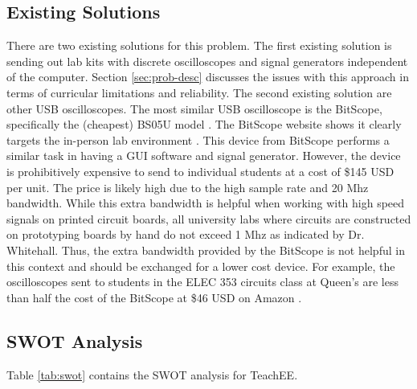 \documentclass[letterpaper,12pt]{article}
\begin{document}
\subsection{Existing Solutions} \label{sec:existing-sol} There are two existing
solutions for this problem. The first existing solution is sending out lab kits
with discrete oscilloscopes and signal generators independent of the computer.
Section \ref{sec:prob-desc} discusses the issues with this approach in terms of
curricular limitations and reliability. The second existing solution are other
USB oscilloscopes. The most similar USB oscilloscope is the BitScope,
specifically the (cheapest) BS05U model \cite{noauthor_bitscope_nodate}. The
BitScope website shows it clearly targets the in-person lab environment
\cite{bitscope_education}. This device from BitScope performs a similar task in
having a GUI software and signal generator. However, the device is prohibitively
expensive to send to individual students at a cost of \$145 USD per unit. The
price is likely high due to the high sample rate and 20 Mhz bandwidth. While
this extra bandwidth is helpful when working with high speed signals on printed
circuit boards, all university labs where circuits are constructed on prototyping
boards by hand do not exceed 1 Mhz as indicated by Dr. Whitehall. Thus, the
extra bandwidth provided by the BitScope is not helpful in this context and
should be exchanged for a lower cost device. For example, the oscilloscopes sent to
students in the ELEC 353 circuits class at Queen's are less than half the cost
of the BitScope at \$46 USD on Amazon \cite{scope_353}.

\subsection{SWOT Analysis}
Table \ref{tab:swot} contains the SWOT analysis for TeachEE.
\end{document}
